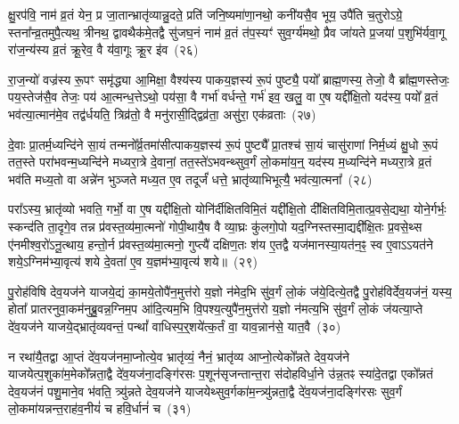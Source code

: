 क्षु॒रप॑वि॒ नाम॑ व्र॒तं येन॒ प्र जा॒तान्भ्रातृ॑व्यान्नु॒दते॒ प्रति॑ जनि॒ष्यमा॑णा॒नथो॒ कनी॑यसै॒व भूय॒ उपै॑ति च॒तुरो\-ऽग्रे॒ स्तना᳚न्व्र॒तमुपै॒त्यथ॒ त्रीनथ॒ द्वावथैक॑मे॒तद्वै सु॑जघ॒नं नाम॑ व्र॒तं त॑प॒स्यꣳ॑ सुव॒र्ग्य॑मथो॒ प्रैव जा॑यते प्र॒जया॑ प॒शुभि॑र्यवा॒गू रा॑ज॒न्य॑स्य व्र॒तं क्रू॒रेव॒ वै य॑वा॒गूः क्रू॒र इ॑व~(२६)\ip

रा॒ज॒न्यो॑ वज्र॑स्य रू॒पꣳ समृ॑द्ध्या आ॒मिक्षा॒ वैश्य॑स्य पाकय॒ज्ञस्य॑ रू॒पं पुष्ट्यै॒ पयो᳚ ब्राह्म॒णस्य॒ तेजो॒ वै ब्रा᳚ह्म॒णस्तेजः॒ पय॒स्तेज॑सै॒व तेजः॒ पय॑ आ॒त्मन्ध॒त्ते\-ऽथो॒ पय॑सा॒ वै गर्भा॑ वर्धन्ते॒ गर्भ॑ इव॒ खलु॒ वा ए॒ष यद्दी᳚क्षि॒तो यद॑स्य॒ पयो᳚ व्र॒तं भव॑त्या॒त्मान॑मे॒व तद्व॑र्धयति॒ त्रिव्र॑तो॒ वै मनु॑रासी॒द्द्विव्र॑ता॒ असु॑रा॒ एक॑व्रताः~(२७)\ip

दे॒वाः प्रा॒तर्म॒ध्यन्दि॑ने सा॒यं तन्मनो᳚र्व्र॒तमा॑सीत्पाकय॒ज्ञस्य॑ रू॒पं पुष्ट्यै᳚ प्रा॒तश्च॑ सा॒यं चासु॑राणां निर्म॒ध्यं क्षु॒धो रू॒पं तत॒स्ते परा॑भवन्म॒ध्यन्दि॑ने मध्यरा॒त्रे दे॒वानां॒ तत॒स्ते॑\-ऽभवन्थ्सुव॒र्गं लो॒कमा॑य॒न्॒ यद॑स्य म॒ध्यन्दि॑ने मध्यरा॒त्रे व्र॒तं भव॑ति मध्य॒तो वा अन्ने॑न भुञ्जते मध्य॒त ए॒व तदूर्जं॑ धत्ते॒ भ्रातृ॑व्याभिभूत्यै॒ भव॑त्या॒त्मना᳚~(२८)\ip




परा᳚\-ऽस्य॒ भ्रातृ॑व्यो भवति॒ गर्भो॒ वा ए॒ष यद्दी᳚क्षि॒तो योनि॑र्दीक्षितविमि॒तं यद्दी᳚क्षि॒तो दी᳚क्षितविमि॒तात्प्र॒वसे॒द्यथा॒ योने॒र्गर्भः॒ स्कन्द॑ति ता॒दृगे॒व तन्न प्र॑वस्त॒व्य॑मा॒त्मनो॑ गोपी॒थायै॒ष वै व्या॒घ्रः कु॑लगो॒पो यद॒ग्निस्तस्मा॒द्यद्दी᳚क्षि॒तः प्र॒वसे॒थ्स ए॑नमीश्व॒रो॑\-ऽनू॒त्थाय॒ हन्तो॒र्न प्र॑वस्त॒व्य॑मा॒त्मनो॒ गुप्त्यै॑ दक्षिण॒तः श॑य ए॒तद्वै यज॑मानस्या॒यत॑न॒ꣴ॒ स्व ए॒वा\-ऽऽयत॑ने शये॒\-ऽग्निम॑भ्या॒वृत्य॑ शये दे॒वता॑ ए॒व य॒ज्ञम॑भ्या॒वृत्य॑ शये॥~(२९)\ip

{\anuvakamend[{ए॒तद्वै क्रू॒र इ॒वैक॑व्रता आ॒त्मना॒ यज॑मानस्य॒ त्रयो॑दश च}]}

पु॒रोह॑विषि देव॒यज॑ने याजये॒द्यं का॒मये॒तोपै॑न॒मुत्त॑रो य॒ज्ञो न॑मेद॒भि सु॑व॒र्गं लो॒कं ज॑ये॒दित्ये॒तद्वै पु॒रोह॑विर्देव॒यज॑नं॒ यस्य॒ होता᳚ प्रातरनुवा॒कम॑नुब्रु॒वन्न॒ग्निम॒प आ॑दि॒त्यम॒भि वि॒पश्य॒त्युपै॑न॒मुत्त॑रो य॒ज्ञो न॑मत्य॒भि सु॑व॒र्गं लो॒कं ज॑यत्या॒प्ते दे॑व॒यज॑ने याजये॒द्भ्रातृ॑व्यवन्तं॒ पन्थां᳚ वाधिस्प॒र्॒\mbox{}शये॑त्क॒र्तं वा॒ याव॒न्नान॑से॒ यात॒वै~(३०)\ip

न रथा॑यै॒तद्वा आ॒प्तं दे॑व॒यज॑नमा॒प्नोत्ये॒व भ्रातृ॑व्यं॒ नैनं॒ भ्रातृ॑व्य आप्नो॒त्येको᳚न्नते देव॒यज॑ने याजयेत्प॒शुका॑म॒मेको᳚न्नता॒द्वै दे॑व॒यज॑ना॒दङ्गि॑रसः प॒शून॑सृजन्तान्त॒रा स॑दोहविर्धा॒ने उ॑न्न॒तꣴ स्या॑दे॒तद्वा एको᳚न्नतं देव॒यज॑नं पशु॒माने॒व भ॑वति॒ त्र्यु॑न्नते देव॒यज॑ने याजयेथ्सुव॒र्गका॑म॒न्त्र्यु॑न्नता॒द्वै दे॑व॒यज॑ना॒दङ्गि॑रसः सुव॒र्गं लो॒कमा॑यन्नन्त॒राह॑व॒नीयं॑ च हवि॒र्धानं॑ च~(३१)\ip

